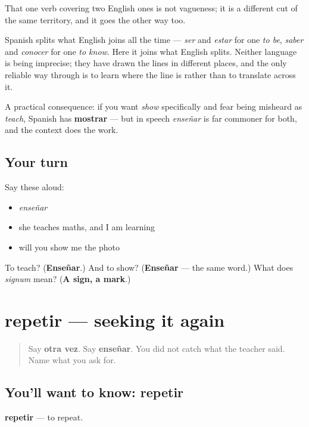 \begin{culture}
That one verb covering two English ones is not vagueness; it is a different cut of the same territory, and it goes the other way too.

Spanish splits what English joins all the time — \emph{ser} and \emph{estar} for one \emph{to be}, \emph{saber} and \emph{conocer} for one \emph{to know}. Here it joins what English splits. Neither language is being imprecise; they have drawn the lines in different places, and the only reliable way through is to learn where the line is rather than to translate across it.

A practical consequence: if you want \emph{show} specifically and fear being misheard as \emph{teach}, Spanish has \textbf{mostrar} — but in speech \emph{enseñar} is far commoner for both, and the context does the work.
\end{culture}

\subsection*{Your turn}
Say these aloud:

\begin{itemize}
\raggedright
  \item \emph{enseñar}
  \item she teaches maths, and I am learning
  \item will you show me the photo
\end{itemize}

\begin{tcolorbox}[breakable,colback=teal!4,colframe=teal!35!black,title={Before you move on}]
To teach? (\textbf{Enseñar}.) And to show? (\textbf{Enseñar} — the same word.) What does \emph{signum} mean? (\textbf{A sign, a mark}.)
\end{tcolorbox}
\section[repetir]{repetir — seeking it again}

\label{lesson:ES-C445-repetir}



\begin{quote}
Say \textbf{otra vez}. Say \textbf{enseñar}. You did not catch what the teacher said. Name what you ask for.
\end{quote}

\subsection*{You'll want to know: repetir}
\textbf{repetir} — to repeat.

